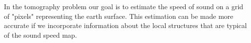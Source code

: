 

In the tomography problem our goal is to estimate the speed of sound on a grid of "pixels" 
representing the earth surface. This estimation can be made more accurate if we incorporate information
about the local structures that are typical of the sound speed map.

